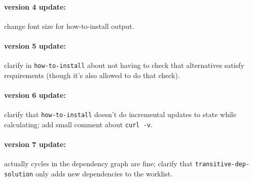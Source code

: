 \documentclass[12pt]{article}
\renewcommand{\_}{\kern-1.5pt\textunderscore\kern-1.5pt}
\begin{document}
\paragraph{version 4 update:} change font size for how-to-install output.

\paragraph{version 5 update:} clarify in \texttt{how-to-install} about not having to check that alternatives satisfy requirements (though it's also allowed to do that check).

\paragraph{version 6 update:} clarify that \texttt{how-to-install} doesn't do incremental updates to state while calculating; add small comment about \verb+curl -v+.

\paragraph{version 7 update:} actually cycles in the dependency graph are fine; clarify that \texttt{transitive-dep-solution} only adds new dependencies to the worklist.
\end{document}
